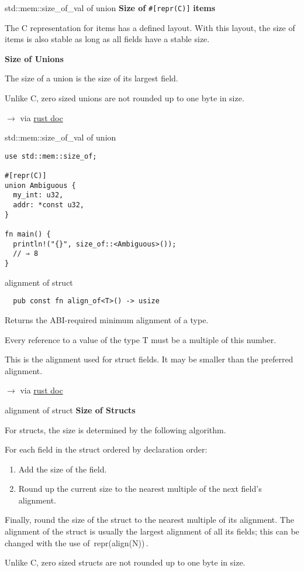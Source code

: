 \documentclass{beamer}
\newcommand\code[1]{\,{\color[HTML]{884400}#1}\,}
\newcommand\source[1]{$\rightarrow$ via #1}
\begin{document}
\begin{frame}[fragile]{std::mem::size\_of\_val of union}
  \textbf{Size of} \texttt{#[repr(C)]} \textbf{ items}

  The C representation for items has a defined layout. With this layout, the size of items is also stable as long as all fields have a stable size.

  \textbf{Size of Unions}

  The size of a union is the size of its largest field.

  Unlike C, zero sized unions are not rounded up to one byte in size.

  \source{\href{https://doc.rust-lang.org/std/mem/fn.size_of.html\#size-of-reprc-items}{rust doc}}
\end{frame}

\begin{frame}[fragile]{std::mem::size\_of\_val of union}
  \begin{verbatim}
use std::mem::size_of;

#[repr(C)]
union Ambiguous {
  my_int: u32,
  addr: *const u32,
}

fn main() {
  println!("{}", size_of::<Ambiguous>());
  // ⇒ 8
}
\end{verbatim}
\end{frame}

\begin{frame}[fragile]{alignment of struct}
  \begin{verbatim}
  pub const fn align_of<T>() -> usize
  \end{verbatim}

  Returns the ABI-required minimum alignment of a type.

  Every reference to a value of the type T must be a multiple of this number.

  This is the alignment used for struct fields. It may be smaller than the preferred alignment.

  \source{\href{https://doc.rust-lang.org/std/mem/fn.size_of.html}{rust doc}}
\end{frame}

\begin{frame}[fragile]{alignment of struct}
  \textbf{Size of Structs}

  For structs, the size is determined by the following algorithm.

  For each field in the struct ordered by declaration order:
  \begin{enumerate}
    \item Add the size of the field.
    \item Round up the current size to the nearest multiple of the next field's alignment.
  \end{enumerate}

  Finally, round the size of the struct to the nearest multiple of its alignment. The alignment of the struct is usually the largest alignment of all its fields; this can be changed with the use of \code{repr(align(N))}.

  Unlike C, zero sized structs are not rounded up to one byte in size.
\end{frame}
\end{document}
